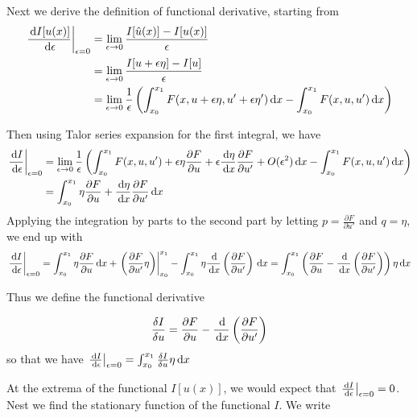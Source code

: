 \documentclass{article}
\begin{document}
Next we derive the definition of functional derivative, starting from 
\begin{align*}
    \left.\frac{\,\mathrm{d} I[u(x)]}{\,\mathrm{d}\epsilon}\right|_{\epsilon=0} &= \lim_{\epsilon\to 0} \frac{I[\hat u(x)]-I[u(x)]}{\epsilon}\\
    &= \lim_{\epsilon\to 0} \frac{I[u+\epsilon\eta]-I[u]}{\epsilon}\\
    &= \lim_{\epsilon\to 0}\frac{1}{\epsilon} \left(  \int_{x_0}^{x_1} F(x,u+\epsilon \eta,u'+\epsilon\eta')\,\mathrm{d} x-\int_{x_0}^{x_1} F(x,u,u')\,\mathrm{d} x  \right)
\end{align*}

Then using Talor series expansion for the first integral, we have
\begin{align*}
    \left.\frac{\,\mathrm{d} I}{\,\mathrm{d}\epsilon}\right|_{\epsilon=0} &=\lim_{\epsilon\to 0}\frac{1}{\epsilon} \left(  \int_{x_0}^{x_1} F(x,u,u') + \epsilon\eta\frac{\partial F}{\partial u}+\epsilon \frac{\,\mathrm{d} \eta}{\,\mathrm{d} x}\frac{\partial F}{\partial u'}+O(\epsilon^2)\,\mathrm{d} x -\int_{x_0}^{x_1} F(x,u,u')\,\mathrm{d} x  \right)\\
    &= \int_{x_0}^{x_1} \eta\frac{\partial F}{\partial u}+\frac{\,\mathrm{d}\eta}{\,\mathrm{d} x} \frac{\partial F}{\partial u'}\,\mathrm{d} x
\end{align*}
Applying the integration by parts to the second part by letting \(p=\frac{\partial F}{\partial u'}\) and \(q=\eta\), we end up with
\[\left.\frac{\,\mathrm{d} I}{\,\mathrm{d}\epsilon}\right|_{\epsilon=0} = \int_{x_0}^{x_1} \eta\frac{\partial F}{\partial u} \,\mathrm{d} x + \left.\left( \frac{\partial F}{\partial u'}\eta \right)\right|_{x_0}^{x_1}- \int_{x_0}^{x_1} \eta\frac{\,\mathrm{d} }{\,\mathrm{d} x} \left( \frac{\partial F}{\partial u'} \right)\,\mathrm{d} x =\int_{x_0}^{x_1}\left( \frac{\partial F}{\partial u}-\frac{\,\mathrm{d} }{\,\mathrm{d} x} \left( \frac{\partial F}{\partial u'} \right) \right) \eta\,\mathrm{d} x\]

Thus we define the functional derivative

\begin{definition}
    
    
    \[\frac{\delta I}{\delta u} = \frac{\partial F}{\partial u}-\frac{\,\mathrm{d} }{\,\mathrm{d} x} \left( \frac{\partial F}{\partial u'} \right)\]
    so that we have \(\left.\frac{\,\mathrm{d} I}{\,\mathrm{d}\epsilon}\right|_{\epsilon=0} = \int_{x_0}^{x_1}\frac{\delta I}{\delta u}  \eta\,\mathrm{d} x\)
\end{definition}

At the extrema of the functional \(I[u(x)]\), we would expect that \(\left.\frac{\,\mathrm{d} I}{\,\mathrm{d}\epsilon}\right|_{\epsilon=0}=0\). Nest we find the stationary function of the functional \(I\). We write
\end{document}
